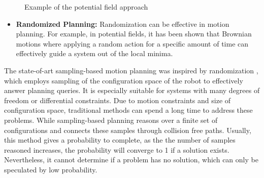 \begin{figure}[H]
\centering
{}
\caption{Example of the potential field approach}
\label{potentialexample}
\end{figure}

\begin{itemize}
    \item \textbf{Randomized Planning:} Randomization can be effective in motion planning. For example, in potential fields, it has been shown that Brownian motions where applying a random action for a specific amount of time can effectively guide a system out of the local minima.
\end{itemize}

The state-of-art sampling-based motion planning was inspired by randomization \citep{OMPLPrim20:online}, which employs sampling of the configuration space of the robot to effectively answer planning queries. It is especially suitable for systems with many degrees of freedom or differential constraints. Due to motion constraints and size of configuration space, traditional methods can spend a long time to address these problems. While sampling-based planning reasons over a finite set of configurations and connects these samples through collision free paths. Usually, this method gives a probability to complete, as the the number of samples reasoned increases, the probability will converge to 1 if a solution exists. Nevertheless, it cannot determine if a problem has no solution, which can only be speculated by low probability. 

